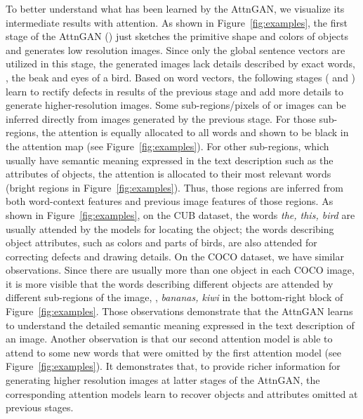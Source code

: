 \documentclass[10pt,twocolumn,letterpaper]{article}
\begin{document}
{To better understand what has been learned by the AttnGAN, we visualize its intermediate results with attention. As shown in Figure~\ref{fig:examples}, the first stage of the AttnGAN () just sketches the primitive shape and colors of objects and generates low resolution images. Since only the global sentence vectors are utilized in this stage, the generated images lack details described by exact words, \eg, the beak and eyes of a bird. Based on word vectors, the following stages ( and ) learn to rectify defects in results of the previous stage and add more details to generate higher-resolution images. Some sub-regions/pixels of  or  images can be inferred directly from images generated by the previous stage. For those sub-regions, the attention is equally allocated to all words and shown to be black in the attention map (see Figure~\ref{fig:examples}). For other sub-regions, which usually have semantic meaning expressed in the text description such as the attributes of objects, the attention is allocated to their most relevant words (bright regions in Figure~\ref{fig:examples}). Thus, those regions are inferred from both word-context features and previous image features of those regions.  As shown in Figure~\ref{fig:examples}, on the CUB dataset, the words \textit{the, this, bird} are usually attended by the  models for locating the object; the words describing object attributes, such as colors and parts of birds, are also attended for correcting defects and drawing details. On the COCO dataset, we have similar observations. Since there are usually more than one object in each COCO image, it is more visible that the words describing different objects are attended by different sub-regions of the image, \eg, \textit{bananas, kiwi} in the bottom-right block of Figure~\ref{fig:examples}. Those observations demonstrate that the AttnGAN learns to understand the detailed semantic meaning expressed in the text description of an image. Another observation is that our second attention model  is able to attend to some new words that were omitted by the first attention model  (see Figure~\ref{fig:examples}). It demonstrates that, to provide richer information for generating higher resolution images at latter stages of the AttnGAN, the corresponding attention models learn to recover objects and attributes omitted at previous stages. 
}
\end{document}
